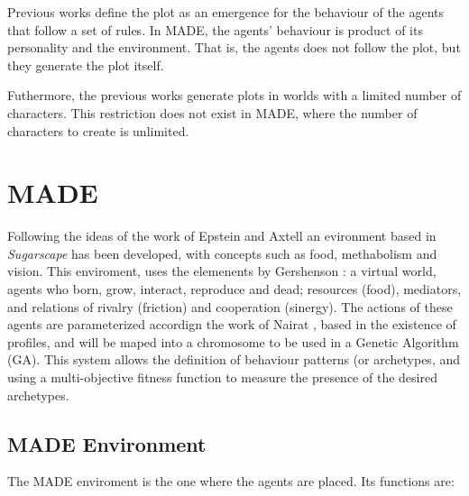 \documentclass[final,1p,times]{elsarticle}
\begin{document}
Previous works define the plot as an emergence for the behaviour of the agents that follow a set of rules. In MADE, the agents' behaviour is product of its personality and the environment. That is, the agents does not follow the plot, but they generate the plot itself. %

Futhermore, the previous works generate plots in worlds with a limited number of characters. This restriction does not exist in MADE, where the number of characters to create is unlimited.


\section{MADE}
\label{sec:made}

Following the ideas of the work of Epstein and Axtell \cite{epstein1996growing} an evironment based in {\em Sugarscape} has been developed, with concepts such as food, methabolism and vision. This enviroment, uses the elemenents  by Gershenson \cite{gershenson2005general}: a virtual world, agents who born, grow, interact, reproduce and dead; resources (food), mediators, and relations of rivalry (friction) and cooperation (sinergy). The actions of these agents are parameterized accordign the work of Nairat \cite{nairat2011character}, based in the existence of profiles, and will be maped into a chromosome to be used in a Genetic Algorithm (GA). This system allows the definition of behaviour patterns (or archetypes, and using a multi-objective fitness function to measure the presence of the desired archetypes. %


\subsection{MADE Environment}
The MADE enviroment is the one where the agents are placed. Its functions are:
\end{document}
